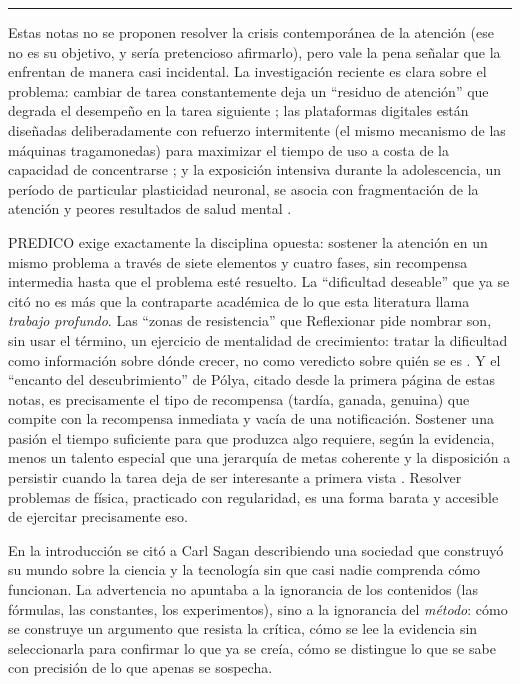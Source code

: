 \documentclass[11pt]{book}
\begin{document}
\medskip
\noindent\rule{\linewidth}{0.4pt}


\medskip
Estas notas no se proponen resolver la crisis contemporánea de la atención (ese no es su objetivo, y sería pretencioso afirmarlo), pero vale la pena señalar que la enfrentan de manera casi incidental. La investigación reciente es clara sobre el problema: cambiar de tarea constantemente deja un ``residuo de atención'' que degrada el desempeño en la tarea siguiente \cite{Newport2016}; las plataformas digitales están diseñadas deliberadamente con refuerzo intermitente (el mismo mecanismo de las máquinas tragamonedas) para maximizar el tiempo de uso a costa de la capacidad de concentrarse \cite{Newport2019}; y la exposición intensiva durante la adolescencia, un período de particular plasticidad neuronal, se asocia con fragmentación de la atención y peores resultados de salud mental \cite{Haidt2024}.

PREDICO exige exactamente la disciplina opuesta: sostener la atención en un mismo problema a través de siete elementos y cuatro fases, sin recompensa intermedia hasta que el problema esté resuelto. La ``dificultad deseable'' que ya se citó \cite{Bjork2011} no es más que la contraparte académica de lo que esta literatura llama {\it trabajo profundo}. Las ``zonas de resistencia'' que Reflexionar pide nombrar son, sin usar el término, un ejercicio de mentalidad de crecimiento: tratar la dificultad como información sobre dónde crecer, no como veredicto sobre quién se es \cite{Dweck2006}. Y el ``encanto del descubrimiento'' de Pólya, citado desde la primera página de estas notas, es precisamente el tipo de recompensa (tardía, ganada, genuina) que compite con la recompensa inmediata y vacía de una notificación. Sostener una pasión el tiempo suficiente para que produzca algo requiere, según la evidencia, menos un talento especial que una jerarquía de metas coherente y la disposición a persistir cuando la tarea deja de ser interesante a primera vista \cite{Duckworth2016}. Resolver problemas de física, practicado con regularidad, es una forma barata y accesible de ejercitar precisamente eso.

\medskip
{}

\medskip
En la introducción se citó a Carl Sagan describiendo una sociedad que construyó su mundo sobre la ciencia y la tecnología sin que casi nadie comprenda cómo funcionan. La advertencia no apuntaba a la ignorancia de los contenidos (las fórmulas, las constantes, los experimentos), sino a la ignorancia del {\it método}: cómo se construye un argumento que resista la crítica, cómo se lee la evidencia sin seleccionarla para confirmar lo que ya se creía, cómo se distingue lo que se sabe con precisión de lo que apenas se sospecha.
\end{document}
